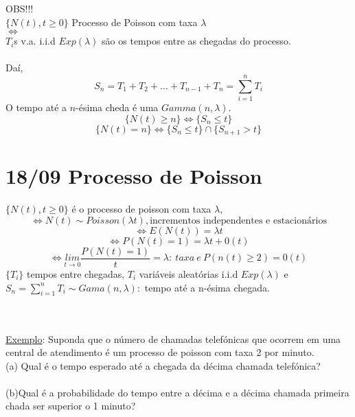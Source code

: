 \documentclass[a4paper,12pt]{article}
\begin{document}
 OBS!!!\\
 $\{N(t),t\ge0\}$  Processo de Poisson com taxa $\lambda$\\
 $\iff$\\
 $T_i$s v.a. i.i.d $Exp(\lambda)$ são os tempos entre as chegadas do processo.\\
 \\
 Da\'i,\\
 $$S_n=T_1+T_2+...+T_{n-1}+T_n=\sum\limits_{i=1}^{n}T_i$$
 O tempo até a $n$-ésima cheda é uma $Gamma(n,\lambda)$.\\
 $$\{N(t)\ge n \}\iff\{S_n\le t \}$$ 
  $$\{N(t)= n \}\iff\{S_n\le t \}\cap\{S_{n+1}> t \}$$ 
 \newpage
 \section*{18/09 Processo de Poisson}
  $\{N(t),t\ge0\}$ \'e o processo de poisson com taxa $\lambda$,
  $$\iff N(t)\sim Poisson(\lambda t), \text{incrementos independentes e estacionários} $$
  $$\iff E(N(t))=\lambda t $$
  $$\iff P(N(t)=1)=\lambda t +0(t) $$
  $$ \iff \underset{t\rightarrow0}{lim}\frac{P(N(t)=1)}{t}=\lambda:\ taxa\ e \ P(n(t)\ge2)=0(t)  $$ 
  $\{T_i\} $ tempos entre chegadas, $T_i$ variáveis aleat\'orias i.i.d $Exp(\lambda)$ e \\$S_n=\sum\limits_{i=1}^{n}T_i\sim Gama(n,\lambda):$ tempo até a n-ésima chegada.\\
  \\
\\
\newpage
\underline{Exemplo}: Suponda que o número de chamadas telefónicas que ocorrem em uma central de atendimento é um processo de poisson com taxa 2 por minuto.\\
(a) Qual é o tempo esperado até a chegada da décima chamada telefónica?\\
\\
(b)Qual é a probabilidade do tempo  entre a décima e a décima chamada primeira chada ser superior o 1 minuto?\\
\end{document}
